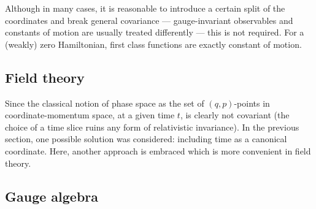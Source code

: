     Although in many cases, it is reasonable to introduce a certain split of the coordinates and break general covariance --- gauge-invariant observables and constants of motion are usually treated differently --- this is not required. For a (weakly) zero Hamiltonian, first class functions are exactly constant of motion.

\subsection{Field theory}

    Since the classical notion of phase space as the set of $(q,p)$-points in coordinate-momentum space, at a given time $t$, is clearly not covariant (the choice of a time slice ruins any form of relativistic invariance). In the previous section, one possible solution was considered: including time as a canonical coordinate. Here, another approach is embraced which is more convenient in field theory.

\subsection{Gauge algebra}

